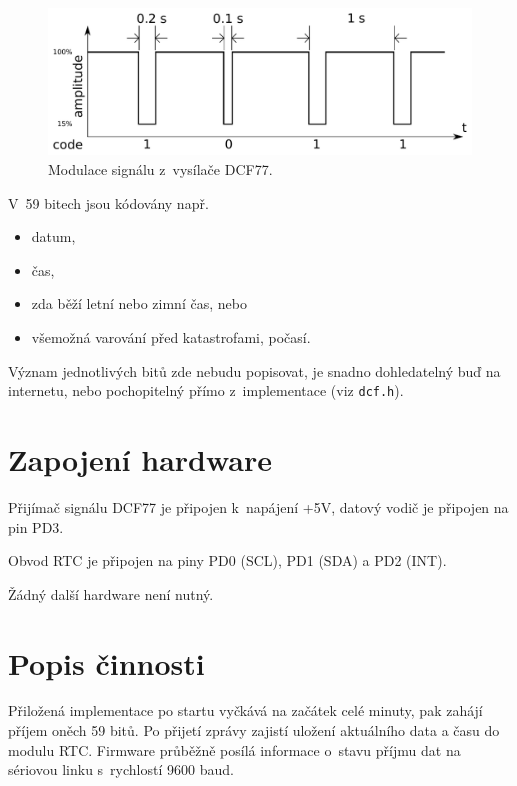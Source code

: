 \documentclass[12pt,a4paper]{article}
\begin{document}
\begin{figure}[ht]
\centering
\label{dcf_signal}
\includegraphics[width=0.8\linewidth]{DCF77_code.pdf}
\caption{Modulace signálu z~vysílače DCF77.}
\end{figure}

V~59 bitech jsou kódovány např.
\begin{itemize}
	\setlength{\itemsep}{1pt}
	\setlength{\parskip}{0pt}
	\setlength{\parsep}{0pt}

	\item datum,
	\item čas,
	\item zda běží letní nebo zimní čas, nebo
	\item všemožná varování před katastrofami, počasí.
\end{itemize}

Význam jednotlivých bitů zde nebudu popisovat, je snadno dohledatelný buď na
internetu, nebo pochopitelný přímo z~implementace (viz \texttt{dcf.h}).

\section{Zapojení hardware}

Přijímač signálu DCF77 je připojen k~napájení +5V, datový vodič je připojen na
pin PD3.

Obvod RTC je připojen na piny PD0 (SCL), PD1 (SDA) a PD2 (INT).

Žádný další hardware není nutný.

\section{Popis činnosti}

Přiložená implementace po startu vyčkává na začátek celé minuty, pak zahájí
příjem oněch 59 bitů. Po přijetí zprávy zajistí uložení aktuálního data
a času do modulu RTC. Firmware průběžně posílá informace o~stavu příjmu dat na
sériovou linku s~rychlostí 9600 baud.
\end{document}
